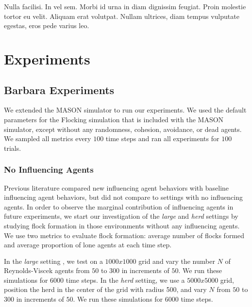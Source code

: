 \begin{savequote}[75mm]
Nulla facilisi. In vel sem. Morbi id urna in diam dignissim feugiat. Proin molestie tortor eu velit. Aliquam erat volutpat. Nullam ultrices, diam tempus vulputate egestas, eros pede varius leo.
\end{savequote}

\chapter{Experiments}

\section{Barbara Experiments}

\label{sec:experimental}
We extended the MASON simulator to run our experiments.\cite{luke05mason}
We used the default parameters for the Flocking simulation that is included
with the MASON simulator, except without any randomness, cohesion, avoidance,
or dead agents.
We sampled all metrics every $100$ time steps and ran all experiments for $100$
trials.

\subsection{No Influencing Agents}
Previous literature compared new influencing agent behaviors with baseline
influencing agent behaviors, but did not compare to settings with no
influencing agents.
In order to observe the marginal contribution of influencing agents
in future experiments, we start our investigation of the \textit{large} and
\textit{herd} settings by studying flock formation in those environments without
any influencing agents.
We use two metrics to evaluate flock formation: average number of flocks
formed and average proportion of lone agents at each time step.

In the \textit{large} setting , we test on a $1000x1000$ grid and vary the
number $N$ of Reynolds-Viscek agents from $50$ to $300$ in increments of $50$.
We run these simulations for $6000$ time steps.
In the \textit{herd} setting, we use a $5000x5000$ grid, position the herd in
the center of the grid with radius 500, and vary $N$ from $50$ to $300$ in
increments of $50$.
We run these simulations for $6000$ time steps.

